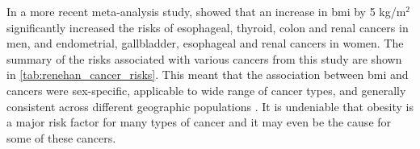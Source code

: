 In a more recent meta-analysis study, \citet{Renehan2008} showed that an increase in \gls{bmi} by 5 kg/m$^2$ significantly increased the risks of esophageal, thyroid, colon and renal cancers in men, and endometrial, gallbladder, esophageal and renal cancers in women.
The summary of the risks associated with various cancers from this study are shown in \cref{tab:renehan_cancer_risks}.
This meant that the association between \gls{bmi} and cancers were sex-specific, applicable to wide range of cancer types, and generally consistent across different geographic populations \citep{Renehan2008,Roberts2010}.
It is undeniable that obesity is a major risk factor for many types of cancer and it may even be the cause for some of these cancers.


